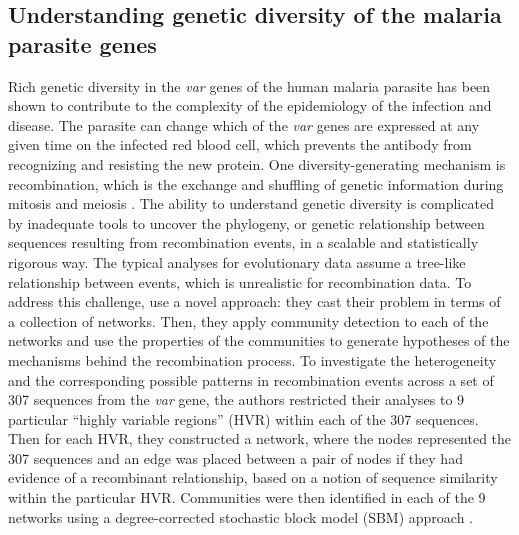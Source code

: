 \subsection{Understanding genetic diversity of the malaria parasite genes}
\indent Rich genetic diversity in the  \emph{var} genes of the human malaria parasite has been shown to contribute to the complexity of the epidemiology of the infection and disease. The parasite can change which of the  \emph{var} genes are expressed at any given time on the infected red blood cell, which prevents the antibody from recognizing and resisting the new protein. One diversity-generating mechanism is recombination, which is the exchange and shuffling of genetic information during mitosis and meiosis \cite{varIntro}. The ability to understand genetic diversity is complicated by inadequate tools to uncover the phylogeny, or genetic relationship between sequences resulting from recombination events, in a scalable and statistically rigorous way. The typical analyses for evolutionary data assume a tree-like relationship between events, which is unrealistic for recombination data. To address this challenge, \cite{larremoreparasite} use a novel approach: they cast their problem in terms of a collection of networks. Then, they apply community detection to each of the networks and use the properties of the communities to generate hypotheses of the mechanisms behind the recombination process. To investigate the heterogeneity and the corresponding possible patterns in recombination events across a set of 307 sequences from the \emph{var} gene, the authors restricted their analyses to 9 particular ``highly variable regions'' (HVR) within each of the 307 sequences. Then for each HVR, they constructed a network, where the nodes represented the 307 sequences and an edge was placed between a pair of nodes if they had evidence of a recombinant relationship, based on a notion of sequence similarity within the particular HVR. Communities were then identified in each of the 9 networks using a degree-corrected stochastic block model (SBM) approach \cite{degreeCorrect}.\\
